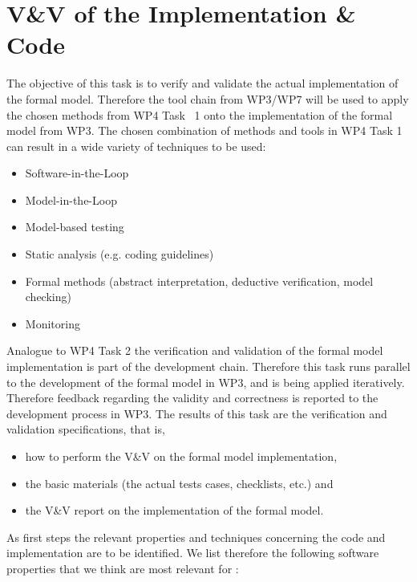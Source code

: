 \section{V\&V of the Implementation \& Code}

The objective of this task is to verify and validate the actual implementation of the formal model.
Therefore the tool chain from WP3\slash WP7 will be used to apply the chosen methods from
WP4 Task~ 1 onto the implementation of the formal model from WP3.
The chosen combination of methods and tools in WP4 Task 1 can result
in a wide variety of techniques to be used:

\begin{itemize}
\item Software-in-the-Loop
\item  Model-in-the-Loop
\item  Model-based testing
\item  Static analysis (e.g. coding guidelines)
\item  Formal methods (abstract interpretation, deductive verification, model checking)
\item  Monitoring
\end{itemize}

Analogue to WP4 Task 2 the verification and validation of the formal model
implementation is part of the development chain.
Therefore this task runs parallel to the development of the formal model in WP3, and is being applied iteratively.
Therefore feedback regarding the validity and correctness is reported to the
development process in WP3.
The results of this task are the verification and validation specifications, that is,

\begin{itemize}
\item 
how to perform the V\&V on the formal model implementation,

\item
the basic materials (the actual tests cases, checklists, etc.) and

\item
the V\&V report on the implementation of the formal model.
\end{itemize}

As first steps the relevant properties and techniques concerning the code and
implementation are to be identified. 
We list therefore the following software properties that we think are most relevant for \vv:

